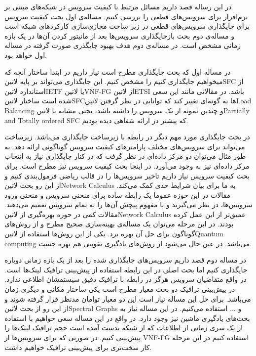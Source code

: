 \documentclass{article}
\begin{document}
در این رساله قصد داریم مسائل مرتبط با کیفیت سرویس در شبکه‌های مبتنی بر نرم‌افزار برای سرویس‌های قطعی را بررسی کنیم.
مساله‌ی اول بحث کیفیت سرویس برای جایگذاری سرویس‌های قطعی در زیر ساخت مجازی‌سازی کارکردهای شبکه است و مساله‌ی دوم بحث بازجایگذاری سرویس‌ها بعد از مانیتور کردن آن‌ها در یک بازه زمانی مشخص است.
در مساله‌ی دوم هدف بهبود جایگذری صورت گرفته در مساله اول خواهد بود.

در مساله اول که بحث جایگذاری مطرح است نیاز داریم در ابتدا ساختار آنچه که میخواهیم جایگذاری کنیم را مشخص کنیم. این جایگذاری می‌تواند بر پایه ‌لاتین{SFC} از استاندارد ‌لاتین{IETF} یا ‌لاتین{VNF-FG} از ‌لاتین{ETSI} باشد.
در مقالاتی مانند این سعی شده است ساختار ‌لاتین{SFC}ها به گونه‌ای تغییر کند که توانایی در نظر گرفتن ‌لاتین{Load Balancing} و چندین نمونه از یک سرویس را داشته باشد، بحثی مشابه با ‌لاتین{Partially and Totally ordered SFC} که پیشتر در ارائه شفاهی دیده بودیم.

در بحث جایگذاری مورد مهم دیگر در رابطه با زیرساخت جایگذاری می‌باشد. زیرساخت می‌تواند برای سرویس‌های مختلف پارامترهای کیفیت سرویس گوناگونی ارائه دهد. به طور مثال می‌توان دو مرکز داده‌ای در نظر گرفت که در کنار جایگذاری نیاز به انتخاب مرکز داده‌ای نیز به وجود می‌آورد.
در اینجا بحث کیفیت سرویس نیز مطرح است. برای بحث کیفیت سرویس نیاز داریم تاخیر سرویس‌ها را در قالب ریاضی فرمول‌بندی کنیم و از این رو بحث ‌لاتین{Network Calculus} به ما برای بیان شرایط حدی کمک می‌کند.
مقالات در این حوزه عموما یک رابطه ساده برای منحنی سرویس و منحنی ورود سرویس‌ها، در نظر می‌گیرند و با مفهوم پیچش آن‌ها را به تمام سرویس تعمیم می‌دهند. مقالات کمی در حوزه بهره‌گیری از ‌لاتین{Network Calculus} عمیق‌تر از این عمل کرده بودند.
در این مرحله می‌توان یک مساله‌ی بهینه‌سازی صحیح مطرح و از روش‌های گوناگون برای حل آن بهره برد. یکی از این روش‌ها استفاده از ‌لاتین{Quantum computing} می‌باشد. در عین حال می‌شود از روش‌های یادگیری تقویتی هم بهره جست.

در مساله دوم قصد داریم سرویس‌های جایگذاری شده را بعد از یک بازه زمانی دوباره جایگذاری کنیم اما بحث اصلی در این رابطه استفاده از پیش‌بینی ترافیک لینک‌ها است.
در واقع متقاضیان سرویس هرگز در رابطه با ترافیک دقیق سیستمشان اطلاعی ندارد. در پیش‌بینی ترافیک دو بحث معیار مطرح است یکی ساختار مکانی و دیگری زمان می‌باشد.
برای حل این مساله نیاز است این دو معیار توامان مدنظر قرار گرفته شوند و از این رو از بحث ‌لاتین{Spectral Graphs} و ... استفاده می‌کنیم.
در این مساله نیاز به بحث‌های یادگیری ماشین نیز وجود دارد. در واقع در این مساله سعی خواهیم با استفاده از یک سری زمانی از اطلاعات که از شبکه بدست آمده است حجم ترافیک لینک‌ها را پیش‌بینی کنیم.
در صورتی که برای سرویس‌ها از VNF-FG استفاده کنیم در این مرحله کار سخت‌تری برای پیش‌بینی ترافیک خواهیم داشت.
\end{document}
